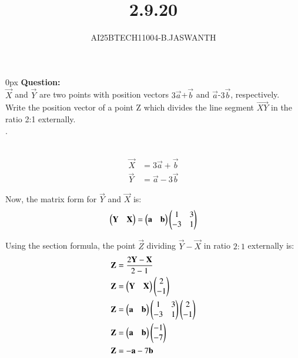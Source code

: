 \documentclass[journal]{IEEEtran}
\begin{document}

\vspace{3cm}


\renewcommand{\thetable}{\theenumi}




\vspace{3cm}


\title{2.9.20}
\author{AI25BTECH11004-B.JASWANTH}
{\let\newpage\relax\maketitle}


\renewcommand{\thefigure}{\theenumi}
\renewcommand{\thetable}{\theenumi}
\setlength{\intextsep}{10pt} %

\parindent 0px
\textbf{Question:} \\
$\vec{X}$ and  $\vec{Y}$ are two points with position vectors $3\vec{a}$+$\vec{b}$  and  $\vec{a}$-$3\vec{b}$, respectively. Write the position vector of a point Z  which divides the line segment  $\vec{XY}$ in the ratio 2:1 externally.\\.

\solution \\

\begin{align}
    \vec{X} &= 3\vec{a}+\vec{b}\\
    \vec{Y} &= \vec{a}-3\vec{b}
\end{align}

Now, the matrix form for $\vec{Y}$ and $\vec{X}$ is:
\begin{align}
\begin{pmatrix}\mathbf{Y} & \mathbf{X}\end{pmatrix}
=\begin{pmatrix}\mathbf{a} & \mathbf{b}\end{pmatrix}
\begin{pmatrix}1 & 3 \\ -3 & 1\end{pmatrix}
\end{align}

Using the section formula, the point $\vec{Z}$ dividing $\vec{Y} - \vec{X}$ in ratio $2:1$ externally is:
\begin{align}
\mathbf{Z} &= \frac{2\mathbf{Y} - \mathbf{X}}{2-1} \\
\mathbf{Z} &=  \begin{pmatrix}\mathbf{Y} & \mathbf{X}\end{pmatrix} \begin{pmatrix}2 \\ -1\end{pmatrix} \\
\mathbf{Z} &=  \begin{pmatrix}\mathbf{a} & \mathbf{b}\end{pmatrix}\begin{pmatrix}1 & 3 \\ -3 & 1\end{pmatrix} \begin{pmatrix}2 \\ -1\end{pmatrix} \\
\mathbf{Z} &= \begin{pmatrix}\mathbf{a} & \mathbf{b}\end{pmatrix} \begin{pmatrix}-1 \\ -7\end{pmatrix} \\
\mathbf{Z} &= -\mathbf{a}-7\mathbf{b}  
\end{align}
\end{document}
